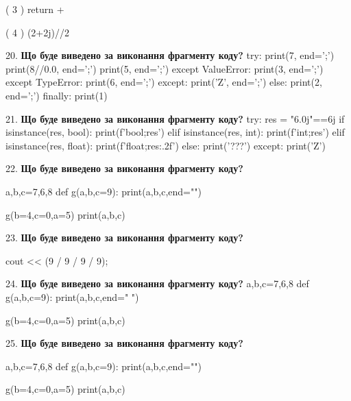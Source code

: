 \documentclass[11pt]{article}
\begin{document}
( 3 ) return +

( 4 ) (2+2j)//2
\par\vspace{5mm}

20. \textbf{Що буде виведено за виконання фрагменту коду?}
try:
    print(7, end=';')
    print(8//0.0, end=';')
    print(5, end=';')
except ValueError:
    print(3, end=';')
except TypeError:
    print(6, end=';')
except:
    print('Z', end=';')
else:
    print(2, end=';')
finally:
    print(1)
\par\vspace{5mm}

21. \textbf{Що буде виведено за виконання фрагменту коду?}
try:
    res = "6.0j"==6j
    if isinstance(res, bool):
        print(f'bool;{res}')
    elif isinstance(res, int):
        print(f'int;{res}')
    elif isinstance(res, float):
        print(f'float;{res:.2f}')
    else:
        print('???')
except:
    print('Z')
\par\vspace{5mm}

22. \textbf{Що буде виведено за виконання фрагменту коду?}

a,b,c=7,6,8
def g(a,b,c=9):
    print(a,b,c,end="")

g(b=4,c=0,a=5)
print(a,b,c)

\par\vspace{5mm}

23. \textbf{Що буде виведено за виконання фрагменту коду?}

cout << (9 / 9 / 9 / 9);
\par\vspace{5mm}

24. \textbf{Що буде виведено за виконання фрагменту коду?}
a,b,c=7,6,8
def g(a,b,c=9):
    print(a,b,c,end=" ")

g(b=4,c=0,a=5)
print(a,b,c)
\par\vspace{5mm}

25. \textbf{Що буде виведено за виконання фрагменту коду?}

a,b,c=7,6,8
def g(a,b,c=9):
    print(a,b,c,end="")

g(b=4,c=0,a=5)
print(a,b,c)

\par\vspace{5mm}
\end{document}
